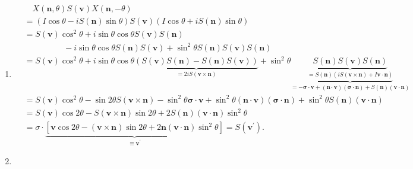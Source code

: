 \documentclass[a4paper,pdflatex,ja=standard]{bxjsarticle}
\begin{document}
\begin{enumerate}
\begin{enumerate}
    \item 

    \begin{align}
      &\quad
      X(\bm{n},\theta)S(\bm{v})X(\bm{n},-\theta)
      \nonumber
      \\
      &=
      (
        I\cos \theta
        -
        iS(\bm{n})\sin\theta
      )
      S(\bm{v})
      (
        I\cos \theta
        +
        iS(\bm{n})\sin\theta
      )
      \nonumber
      \\
      &=
      S(\bm{v})
      \cos^2\theta
      +
      i\sin\theta\cos\theta S(\bm{v})S(\bm{n})
      \nonumber
      \\
      &\hspace{2cm}
      -
      i\sin\theta\cos\theta S(\bm{n})S(\bm{v})
      +
      \sin^2\theta S(\bm{n})S(\bm{v})S(\bm{n})
      \nonumber
      \\
      &=
      S(\bm{v})
      \cos^2\theta
      +
      i\sin\theta\cos\theta
      \underbrace{
        (
          S(\bm{v})S(\bm{n})-S(\bm{n})S(\bm{v})
        )
      }_{=2iS(\bm{v}\times\bm{n})}
      +
      \sin^2\theta 
      \underbrace{
        \underbrace{
          S(\bm{n})S(\bm{v})S(\bm{n})
        }_{
          =
          S(\bm{n})(iS(\bm{v}\times\bm{n})+I\bm{v}\cdot\bm{n})
        }}_{
          =
          -
          \bm{\sigma}\cdot\bm{v}
          +
          (\bm{n}\cdot\bm{v})(\bm{\sigma}\cdot\bm{n})
          +
          S(\bm{n})(\bm{v}\cdot\bm{n})
      }
      \nonumber
      \\
      &=
      S(\bm{v})\cos^2\theta
      -
      \sin2\theta
      S(\bm{v}\times\bm{n})
      -
      \sin^2\theta
      \bm{\sigma}\cdot\bm{v}
      +
      \sin^2\theta
      (\bm{n}\cdot\bm{v})(\bm{\sigma}\cdot\bm{n})
      +
      \sin^2\theta
      S(\bm{n})(\bm{v}\cdot\bm{n})
      \nonumber
      \\
      &=
      S(\bm{v})\cos 2\theta
      -
      S(\bm{v}\times\bm{n})\sin 2\theta
      +
      2S(\bm{n})
      (\bm{v}\cdot\bm{n})
      \sin^2\theta
      \nonumber
      \\
      &=
      \sigma
      \cdot
      \underbrace{
        \left[  
          \bm{v}\cos 2\theta
          -
          (\bm{v}\times\bm{n})\sin 2\theta
          +
          2\bm{n}
          (\bm{v}\cdot\bm{n})
          \sin^2\theta
        \right]
      }_{\equiv \bm{v}^{\prime}}
      =
      S(\bm{v}^{\prime})
      .
    \end{align}


    \item 


\end{enumerate}
\end{enumerate}
\end{document}
